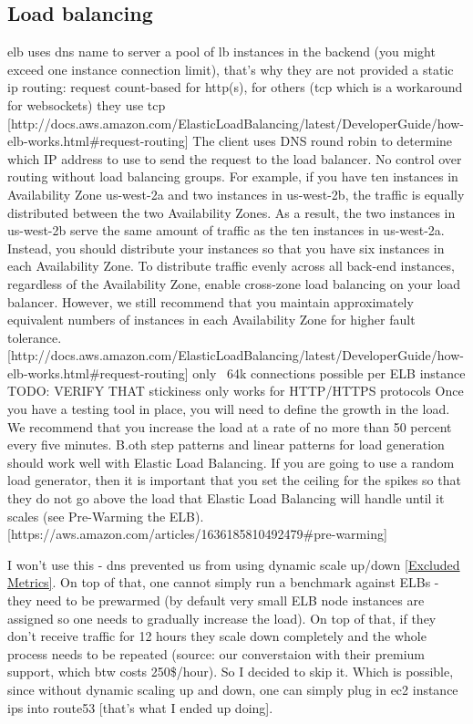 \documentclass{uvamscse}
\begin{document}
\subsection{Load balancing}
  elb uses dns name to server a pool of lb instances in the backend (you might exceed one instance connection limit), that's why they are not provided a static ip
  routing: request count-based for http(s), for others (tcp which is a workaround for websockets) they use tcp [http://docs.aws.amazon.com/ElasticLoadBalancing/latest/DeveloperGuide/how-elb-works.html\#request-routing]
  The client uses DNS round robin to determine which IP address to use to send the request to the load balancer. No control over routing without load balancing groups.
  For example, if you have ten instances in Availability Zone us-west-2a and two instances in us-west-2b, the traffic is equally distributed between the two Availability Zones. As a result, the two instances in us-west-2b serve the same amount of traffic as the ten instances in us-west-2a. Instead, you should distribute your instances so that you have six instances in each Availability Zone.
  To distribute traffic evenly across all back-end instances, regardless of the Availability Zone, enable cross-zone load balancing on your load balancer. However, we still recommend that you maintain approximately equivalent numbers of instances in each Availability Zone for higher fault tolerance.
  [http://docs.aws.amazon.com/ElasticLoadBalancing/latest/DeveloperGuide/how-elb-works.html\#request-routing]
  only ~64k connections possible per ELB instance TODO: VERIFY THAT
  stickiness only works for HTTP/HTTPS protocols
  Once you have a testing tool in place, you will need to define the growth in the load. We recommend that you increase the load at a rate of no more than 50 percent every five minutes. B.oth step patterns and linear patterns for load generation should work well with Elastic Load Balancing. If you are going to use a random load generator, then it is important that you set the ceiling for the spikes so that they do not go above the load that Elastic Load Balancing will handle until it scales (see Pre-Warming the ELB).
  [https://aws.amazon.com/articles/1636185810492479\#pre-warming]

  I won't use this - dns prevented us from using dynamic scale up/down \ref{Excluded Metrics}. On top of that, one cannot simply run a benchmark against ELBs - they need to be prewarmed (by default very small ELB node instances are assigned so one needs to gradually increase the load). On top of that, if they don't receive traffic for 12 hours they scale down completely and the whole process needs to be repeated (source: our converstaion with their premium support, which btw costs 250\$/hour). So I decided to skip it. Which is possible, since without dynamic scaling up and down, one can simply plug in ec2 instance ips into route53 [that's what I ended up doing].
\end{document}
